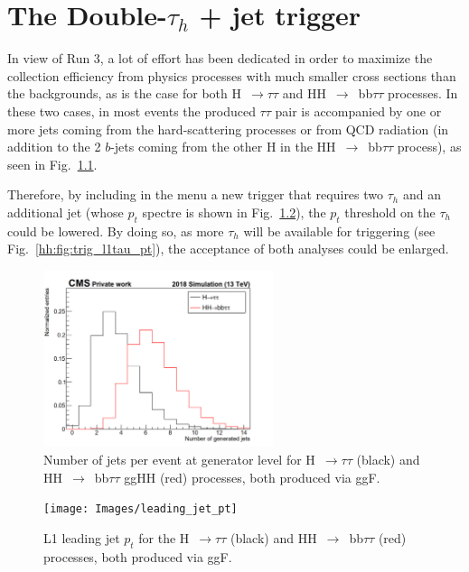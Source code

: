 \documentclass[../main.tex]{subfiles}
\begin{document}
\chapter{The Double-$\tau_h$ + jet trigger}

In view of Run 3, a lot of effort has been dedicated in order to maximize the collection efficiency from physics processes with much smaller cross sections than the backgrounds, as is the case for both H~$\to\tau\tau$ and HH~$\to$~bb$\tau\tau$ processes. In these two cases, in most events the produced $\tau\tau$ pair is accompanied by one or more jets coming from the hard-scattering processes or from QCD radiation (in addition to the 2 $b$-jets coming from the other H in the HH~$\to$~bb$\tau\tau$ process), as seen in Fig.~\ref{hh:fig:trig_ngenjets}.

Therefore, by including in the menu a new trigger that requires two $\tau_h$ and an additional jet (whose $p_t$ spectre is shown in Fig.~\ref{hh:fig:trig_l1jet_pt}), the $p_t$ threshold on the $\tau_h$ could be lowered. By doing so, as more $\tau_h$ will be available for triggering (see Fig.~\ref{hh:fig:trig_l1tau_pt}), the acceptance of both analyses could be enlarged.


\begin{figure}[h!]
\begin{center}
\includegraphics[width=0.6\textwidth]{Images/ngenjets}
\end{center}
\caption{Number of jets  per event at generator level for H~$\to\tau\tau$ (black) and HH~$\to$~bb$\tau\tau$ ggHH (red) processes, both produced via ggF.}
\label{hh:fig:trig_ngenjets}
\end{figure}

\begin{figure}[h!]
\begin{center}
\texttt{[image: Images/leading\_jet\_pt]}
\end{center}
\caption{L1 leading jet $p_t$ for the H~$\to\tau\tau$ (black) and HH~$\to$~bb$\tau\tau$ (red) processes, both produced via ggF.}
\label{hh:fig:trig_l1jet_pt}
\end{figure}
\end{document}
